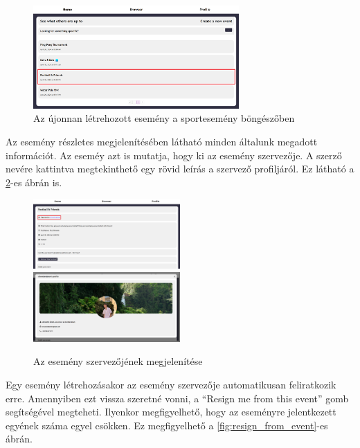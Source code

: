 \newpage

\begin{figure}[ht]
	\centering
	\includegraphics[width=0.7\textwidth]{images/new_event_created.png}
	\caption{Az újonnan létrehozott esemény a sportesemény böngészőben}
	\label{fig:new_event_created}
\end{figure}

Az esemény részletes megjelenítésében látható minden általunk megadott információt. Az eseméy azt is mutatja, hogy ki az esemény szervezője. A szerző nevére
kattintva megtekinthető egy rövid leírás a szervező profiljáról. Ez látható a \ref{fig:event_creator}-es ábrán is.

\begin{figure}[h]
	\includegraphics[width=0.5\textwidth]{images/sports_event_creator.png}
	\includegraphics[width=0.5\textwidth]{images/sports_event_creator_profile_view.png}
	\caption{Az esemény szervezőjének megjelenítése}
	\label{fig:event_creator}
\end{figure}

Egy esemény létrehozásakor az esemény szervezője automatikusan feliratkozik erre. Amennyiben ezt vissza szeretné vonni, a
``Resign me from this event'' gomb segítségével megteheti. Ilyenkor megfigyelhető, hogy az eseményre jelentkezett egyének száma egyel csökken.
Ez megfigyelhető a \ref{fig:resign_from_event}-es ábrán.

